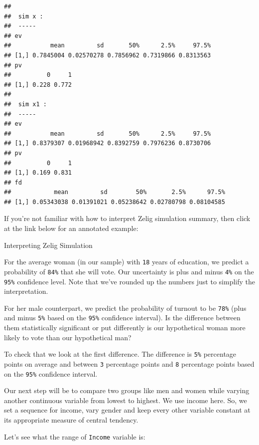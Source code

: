 \documentclass[]{article}
\newenvironment{Shaded}{\begin{snugshade}}{\end{snugshade}}
\newcommand{\KeywordTok}[1]{\textcolor[rgb]{0.13,0.29,0.53}{\textbf{{#1}}}}
\newcommand{\NormalTok}[1]{{#1}}
\theoremstyle{definition}
\theoremstyle{definition}
\theoremstyle{remark}
\begin{document}
\begin{verbatim}
## 
##  sim x :
##  -----
## ev
##           mean         sd       50%      2.5%     97.5%
## [1,] 0.7845004 0.02570278 0.7856962 0.7319866 0.8313563
## pv
##          0     1
## [1,] 0.228 0.772
## 
##  sim x1 :
##  -----
## ev
##           mean         sd       50%      2.5%     97.5%
## [1,] 0.8379307 0.01968942 0.8392759 0.7976236 0.8730706
## pv
##          0     1
## [1,] 0.169 0.831
## fd
##            mean         sd        50%       2.5%      97.5%
## [1,] 0.05343038 0.01391021 0.05238642 0.02780798 0.08104585
\end{verbatim}

If you're not familiar with how to interpret Zelig simulation summary,
then click at the link below for an annotated example:

Interpreting Zelig Simulation

For the average woman (in our sample) with \texttt{18} years of
education, we predict a probability of \texttt{84\%} that she will vote.
Our uncertainty is plus and minus \texttt{4\%} on the \texttt{95\%}
confidence level. Note that we've rounded up the numbers just to
simplify the interpretation.

For her male counterpart, we predict the probability of turnout to be
\texttt{78\%} (plus and minus \texttt{5\%} based on the \texttt{95\%}
confidence interval). Is the difference between them statistically
significant or put differently is our hypothetical woman more likely to
vote than our hypothetical man?

To check that we look at the first difference. The difference is
\texttt{5\%} percentage points on average and between \texttt{3}
percentage points and \texttt{8} percentage points based on the
\texttt{95\%} confidence interval.

Our next step will be to compare two groups like men and women while
varying another continuous variable from lowest to highest. We use
income here. So, we set a sequence for income, vary gender and keep
every other variable constant at its appropriate measure of central
tendency.

Let's see what the range of \texttt{Income} variable is:

\begin{Shaded}
\end{Shaded}
\end{document}
